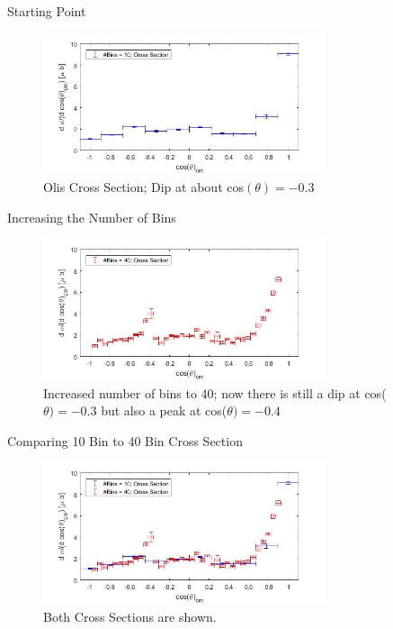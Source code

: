 \documentclass[
		10pt
		]{beamer}
\begin{document}
\begin{frame}{Starting Point}



\begin{figure}

	\centering
	\includegraphics[width=8.3cm]{Plots/1}
	\captionsetup{labelformat=empty}
	\caption{Olis Cross Section; Dip at about cos$(\theta)=-0.3$}
\end{figure}
\end{frame}


\begin{frame}{Increasing the Number of Bins}
	\begin{figure}
		\centering
		\includegraphics[width=8.3cm]{Plots/2}
		\captionsetup{labelformat=empty}
		\caption{Increased number of bins to 40; now there is still a dip at cos($\theta)=-0.3$ but also a peak at cos($\theta)=-0.4$}
	\end{figure}
\end{frame}





\begin{frame}{Comparing 10 Bin to 40 Bin Cross Section}
		
	\begin{figure}
		\centering
		\includegraphics[width=8.3cm]{Plots/3}
		\captionsetup{labelformat=empty}
		\caption{Both Cross Sections are shown.}
	\end{figure}
	
\end{frame}
\end{document}
